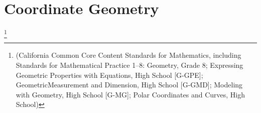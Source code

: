 \section[Coordinate Geometry]{Coordinate Geometry}








\footnote[2]{(California Common Core Content Standards for Mathematics, including Standards for Mathematical Practice 1–8: Geometry, Grade 8; Expressing Geometric Properties with Equations, High School [G-GPE]; GeometricMeasurement and Dimension, High School [G-GMD]; Modeling with Geometry, High School [G-MG]; Polar
Coordinates and Curves, High School)}